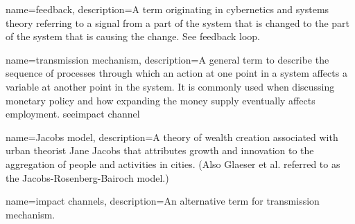 









{
name=feedback,
description={A term originating in cybernetics and systems theory referring to a signal from a part of the system that is changed to the part of the system that is causing the change. See \gls{feedback loop}. }
}

{
name=transmission mechanism,
description={A general term to describe the sequence of processes through which an action at one point in a system affects a variable at another point in the system. It is commonly used when discussing monetary policy and how expanding the money supply eventually affects employment. see\gls{impact channel}}
}


{
name=Jacobs model,
description={A theory of wealth creation associated with urban theorist Jane Jacobs that attributes growth and innovation to the aggregation of people and activities in cities. (Also Glaeser et al. \cite{glaeserGrowthCities1991} referred to as the Jacobs-Rosenberg-Bairoch model.) } 
}

{
name=impact channels,
description={An alternative term for \gls{transmission mechanism}.}
}

